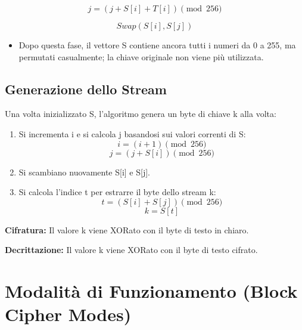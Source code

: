 \documentclass{article}
\begin{document}
\begin{equation*}
    j = (j + S[i] + T[i]) \pmod{256}
\end{equation*}

\begin{equation*}
    Swap(S[i], S[j])
\end{equation*}

\begin{itemize}
    \item Dopo questa fase, il vettore S contiene ancora tutti i numeri da 0 a 255, ma permutati casualmente; la chiave originale non viene più utilizzata.
\end{itemize}

\subsection*{Generazione dello Stream}

Una volta inizializzato S, l'algoritmo genera un byte di chiave k alla volta:

\begin{enumerate}
    \item Si incrementa i e si calcola j basandosi sui valori correnti di S:
    \begin{equation*}
        i = (i + 1) \pmod{256}
    \end{equation*}
    \begin{equation*}
        j = (j + S[i]) \pmod{256}
    \end{equation*}
    \item Si scambiano nuovamente S[i] e S[j].
    \item Si calcola l'indice t per estrarre il byte dello stream k:
    \begin{equation*}
        t = (S[i] + S[j]) \pmod{256}
    \end{equation*}
    \begin{equation*}
        k = S[t]
    \end{equation*}
\end{enumerate}

\noindent \textbf{Cifratura:} Il valore k viene XORato con il byte di testo in chiaro.

\noindent \textbf{Decrittazione:} Il valore k viene XORato con il byte di testo cifrato.

\vspace{0.8cm}

\section*{Modalità di Funzionamento (Block Cipher Modes)}
\end{document}
